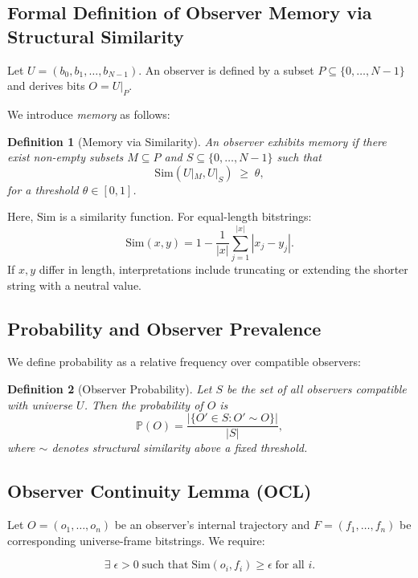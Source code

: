 \documentclass[11pt]{article}
\newtheorem{definition}{Definition}
\begin{document}
\subsection{Formal Definition of Observer Memory via Structural Similarity}

Let \(U = (b_0,b_1,\dots,b_{N-1})\). An observer is defined by a subset \(P\subseteq \{0,\dots,N-1\}\) and derives bits \(O = U|_P\).

We introduce \emph{memory} as follows:

\begin{definition}[Memory via Similarity]
    An observer exhibits memory if there exist non-empty subsets \(M\subseteq P\) and \(S\subseteq \{0,\dots,N-1\}\) such that
    \[
        \mathrm{Sim}(U|_M, U|_S)\;\ge\;\theta,
    \]
    for a threshold \(\theta\in[0,1]\).
\end{definition}

Here, \(\mathrm{Sim}\) is a similarity function. For equal-length bitstrings:
\[
    \mathrm{Sim}(x,y)=1-\frac1{|x|}\sum_{j=1}^{|x|} |x_j-y_j|.
\]
If \(x,y\) differ in length, interpretations include truncating or extending the shorter string with a neutral value.

\subsection{Probability and Observer Prevalence}

We define probability as a relative frequency over compatible observers:

\begin{definition}[Observer Probability]
    Let $S$ be the set of all observers compatible with universe $U$. Then the probability of $O$ is
    \[
        \mathbb{P}(O) = \frac{|\{O' \in S : O' \sim O\}|}{|S|},
    \]
    where $\sim$ denotes structural similarity above a fixed threshold.
\end{definition}

\subsection{Observer Continuity Lemma (OCL)}

Let \(O=(o_1,\dots,o_n)\) be an observer’s internal trajectory and \(F=(f_1,\dots,f_n)\) be corresponding universe-frame bitstrings. We require:

\[
    \exists\;\epsilon>0\;\text{such that}\;\mathrm{Sim}(o_i, f_i)\ge\epsilon\;\text{for all }i.
\]
\end{document}
